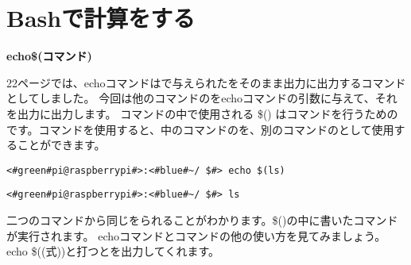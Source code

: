 \begin{tcolorbox}[title=\useOmetoi]
    \begin{enumerate}
\end{enumerate}
\end{tcolorbox}

\newpage
\section{Bashで計算をする}
\noindent

{\bf echo\textvisiblespace\$(コマンド) }

22ページでは、echoコマンドはで与えられたをそのまま出力に出力するコマンドとしてしました。
今回は他のコマンドのをechoコマンドの引数に与えて、それを出力に出力します。
コマンドの中で使用される \$() はコマンドを行うためのです。コマンドを使用すると、中のコマンドのを、別のコマンドのとして使用することができます。
\begin{lstlisting}[caption=echo コマンド置換を使った例1, label=cmdsbs:echo]
<#green#pi@raspberrypi#>:<#blue#~/ $#> echo $(ls)
\end{lstlisting} 

\begin{lstlisting}[caption=lsコマンドの出力, label=cmdsbs:ls]
<#green#pi@raspberrypi#>:<#blue#~/ $#> ls
\end{lstlisting}

二つのコマンドから同じをられることがわかります。\$()の中に書いたコマンドが実行されます。
echoコマンドとコマンドの他の使い方を見てみましょう。echo \$((式))と打つとを出力してくれます。

